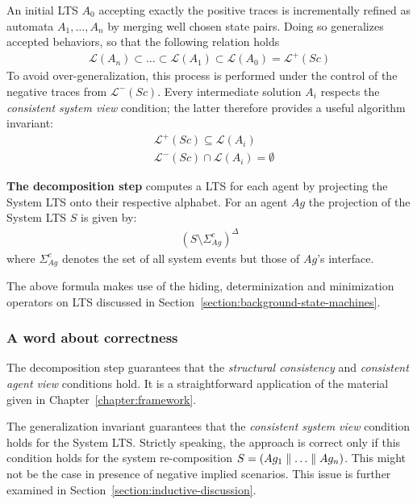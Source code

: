 An initial LTS $A_0$ accepting exactly the positive traces is incrementally refined as automata $A_1,\ldots,A_n$ by merging well chosen state pairs. Doing so generalizes accepted behaviors, so that the following relation holds
\begin{align*}
\mathcal{L}(A_n) \subset \ldots \subset \mathcal{L}(A_1) \subset \mathcal{L}(A_0) = \mathcal{L}^+(Sc)
\end{align*}
To avoid over-generalization, this process is performed under the control of the negative traces from $\mathcal{L}^-(Sc)$. Every intermediate solution $A_i$ respects the \emph{consistent system view} condition; the latter therefore provides a useful algorithm invariant:
\begin{align}
&\mathcal{L}^+(Sc) \subseteq \mathcal{L}(A_i) \\
&\mathcal{L}^-(Sc) \cap \mathcal{L}(A_i) = \emptyset
\label{relation:inductive-invariant}
\end{align}

\noindent \textbf{The decomposition step} computes a LTS for each agent by projecting the System LTS onto their respective alphabet. For an agent $Ag$ the projection of the System LTS $S$ is given by:
\begin{align}
(S \setminus \Sigma_{Ag}^c)^\Delta
\end{align}
\noindent where $\Sigma_{Ag}^c$ denotes the set of all system events but those of $Ag$'s interface.

The above formula makes use of the hiding, determinization and minimization operators on LTS discussed in Section~\ref{section:background-state-machines}.

\subsubsection*{A word about correctness}

The decomposition step guarantees that the \emph{structural consistency} and \emph{consistent agent view} conditions hold. It is a straightforward application of the material given in Chapter~\ref{chapter:framework}. 

The generalization invariant guarantees that the \emph{consistent system view} condition holds for the System LTS. Strictly speaking, the approach is correct only if this condition holds for the system re-composition $S = (Ag_1 \parallel \ldots \parallel Ag_n)$. This might not be the case in presence of negative implied scenarios. This issue is further examined in Section~\ref{section:inductive-discussion}.

